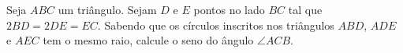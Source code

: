Seja $ABC$ um triângulo. Sejam $D$ e $E$ pontos no lado $BC$ tal que $2BD = 2DE = EC$.
Sabendo que os círculos inscritos nos triângulos $ABD$, $ADE$ e $AEC$ tem o mesmo raio, calcule o seno do ângulo $\angle ACB$.
